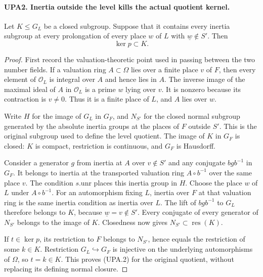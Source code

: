 \paragraph{UPA2. Inertia outside the level kills the actual quotient kernel.}
\label{claim:UPA2}
Let $K\leq G_L$ be a closed subgroup.  Suppose that it contains every
inertia subgroup at every prolongation of every place $w$ of $L$
with $\underline w\notin S'$.  Then
\[
                         \ker p\subset K.                    \tag{UPA.2}
\]
\begin{proof}
First record the valuation-theoretic point used in passing between
the two number fields.  If a valuation ring $A\subset\Omega$ lies
over a finite place $v$ of $F$, then every element of $\mathcal O_L$
is integral over $A$ and hence lies in $A$.  The inverse image of
the maximal ideal of $A$ in $\mathcal O_L$ is a prime $w$ lying
over $v$.  It is nonzero because its contraction is $v\ne0$.
Thus it is a finite place of $L$, and $A$ lies over $w$.

Write $H$ for the image of $G_L$ in $G_F$, and $N_{S'}$ for the
closed normal subgroup generated by the absolute inertia groups
at the places of $F$ outside $S'$.  This is the original subgroup
used to define the level quotient.  The image of $K$ in $G_F$
is closed: $K$ is compact, restriction is continuous, and $G_F$
is Hausdorff.

Consider a generator $g$ from inertia at $A$ over
$v\notin S'$ and any conjugate $bgb^{-1}$ in $G_F$.
It belongs to inertia at the transported valuation ring
$A\circ b^{-1}$ over the same place $v$.  The condition
$s.\mathrm{unr}$ places this inertia group in $H$.
Choose the place $w$ of $L$ under $A\circ b^{-1}$.
For an automorphism fixing $L$, inertia over $F$ at that
valuation ring is the same inertia condition as inertia over $L$.
The lift of $bgb^{-1}$ to $G_L$ therefore belongs to $K$,
because $\underline w=v\notin S'$.
Every conjugate of every generator of $N_{S'}$ belongs to
the image of $K$.  Closedness now gives
$N_{S'}\subset\operatorname{res}(K)$.

If $t\in\ker p$, its restriction to $F$ belongs to $N_{S'}$,
hence equals the restriction of some $k\in K$.
Restriction $G_L\hookrightarrow G_F$ is injective on the
underlying automorphisms of $\Omega$, so $t=k\in K$.
This proves (UPA.2) for the original quotient, without replacing
its defining normal closure.
\end{proof}

